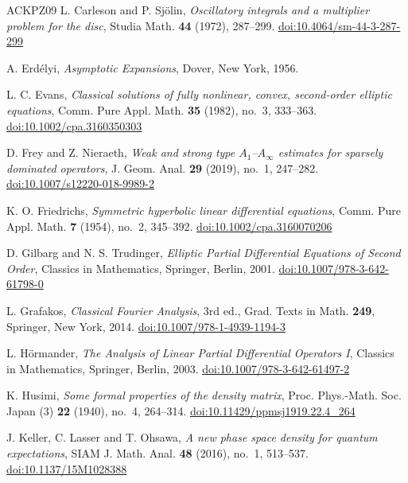 \begin{thebibliography}{ACKPZ09}
 L. Carleson and P. Sj\"olin, \emph{Oscillatory integrals and a multiplier problem for the disc}, Studia Math. \textbf{44} (1972), 287--299. \href{https://doi.org/10.4064/sm-44-3-287-299}{doi:10.4064/sm-44-3-287-299}

 A. Erd\'elyi, \emph{Asymptotic Expansions}, Dover, New York, 1956.

 L. C. Evans, \emph{Classical solutions of fully nonlinear, convex, second-order elliptic equations}, Comm. Pure Appl. Math. \textbf{35} (1982), no.~3, 333--363. \href{https://doi.org/10.1002/cpa.3160350303}{doi:10.1002/cpa.3160350303}

 D. Frey and Z. Nieraeth, \emph{Weak and strong type $A_1$--$A_\infty$ estimates for sparsely dominated operators}, J. Geom. Anal. \textbf{29} (2019), no.~1, 247--282. \href{https://doi.org/10.1007/s12220-018-9989-2}{doi:10.1007/s12220-018-9989-2}

 K. O. Friedrichs, \emph{Symmetric hyperbolic linear differential equations}, Comm. Pure Appl. Math. \textbf{7} (1954), no.~2, 345--392. \href{https://doi.org/10.1002/cpa.3160070206}{doi:10.1002/cpa.3160070206}

 D. Gilbarg and N. S. Trudinger, \emph{Elliptic Partial Differential Equations of Second Order}, Classics in Mathematics, Springer, Berlin, 2001. \href{https://doi.org/10.1007/978-3-642-61798-0}{doi:10.1007/978-3-642-61798-0}

 L. Grafakos, \emph{Classical Fourier Analysis}, 3rd ed., Grad. Texts in Math. \textbf{249}, Springer, New York, 2014. \href{https://doi.org/10.1007/978-1-4939-1194-3}{doi:10.1007/978-1-4939-1194-3}

 L. H\"ormander, \emph{The Analysis of Linear Partial Differential Operators I}, Classics in Mathematics, Springer, Berlin, 2003. \href{https://doi.org/10.1007/978-3-642-61497-2}{doi:10.1007/978-3-642-61497-2}

 K. Husimi, \emph{Some formal properties of the density matrix}, Proc. Phys.-Math. Soc. Japan (3) \textbf{22} (1940), no.~4, 264--314. \href{https://doi.org/10.11429/ppmsj1919.22.4_264}{doi:10.11429/ppmsj1919.22.4\_264}

 J. Keller, C. Lasser and T. Ohsawa, \emph{A new phase space density for quantum expectations}, SIAM J. Math. Anal. \textbf{48} (2016), no.~1, 513--537. \href{https://doi.org/10.1137/15M1028388}{doi:10.1137/15M1028388}


\end{thebibliography}
